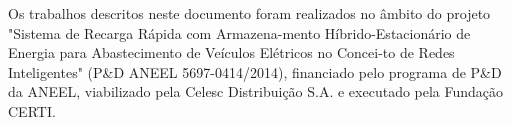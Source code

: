   Os trabalhos descritos neste documento foram realizados no âmbito do projeto "Sistema de Recarga Rápida com Armazena-mento Híbrido-Estacionário de Energia para Abastecimento de Veículos Elétricos no Concei-to de Redes Inteligentes" (P\&D ANEEL 5697-0414/2014), financiado pelo programa de P\&D da ANEEL, viabilizado pela Celesc Distribuição S.A. e executado pela Fundação CERTI.
  